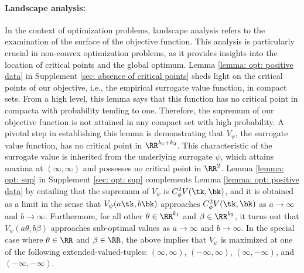 \documentclass[preprint] {imsart}
\begin{document}
{\paragraph{Landscape analysis:} In the context of optimization problems, landscape analysis refers to the examination of the surface of the objective function. This analysis is particularly crucial in non-convex optimization problems, as it provides insights into the location of critical points and the global optimum.
   Lemma \ref{lemma: opt: positive data} in Supplement \ref{sec: absence of critical points} sheds light on the critical points of our objective, i.e., the empirical surrogate value function, in compact sets.  From a high level, this lemma says that this function has no critical point in compacta with probability tending to one.  Therefore, the supremum of our objective function is not attained in any compact set with high probability. A pivotal step in establishing this lemma is demonstrating that $V_\psi$, the   surrogate value function, has no critical point in  $\RR^{k_1+k_2}$. This characteristic of the surrogate value is  inherited from the underlying surrogate $\psi$, which attains maxima at $(\infty,\infty)$ and possesses no critical point in $\RR^2$.  Lemma \ref{lemma: opt: sup} in Supplement \ref{sec: opt: sup}  complements Lemma \ref{lemma: opt: positive data} by entailing that  the supremum of $V_\psi$ is  $C_\phi^2 V(\tk,\bk)$, and it is obtained as a limit in the sense that $V_\psi(a\tk,b\bk)$ approaches $C_\phi^2V(\tk,\bk)$ as $a\to\infty$ and $b\to\infty$. Furthermore, for all other $\theta\in\RR^{k_1}$ and $\beta\in\RR^{k_2}$, it turns out that $V_\psi(a\theta,b\beta)$ approaches sub-optimal values as $a\to\infty$ and $b\to\infty$. In the special case where $\theta\in\RR$ and $\beta\in\RR$, the above implies that $V_\psi$ is maximized at one of the following extended-valued-tuples:  $(\infty,\infty)$, $(-\infty,\infty)$, $(\infty,-\infty)$, and $(-\infty,-\infty)$.  
 
}
\end{document}

